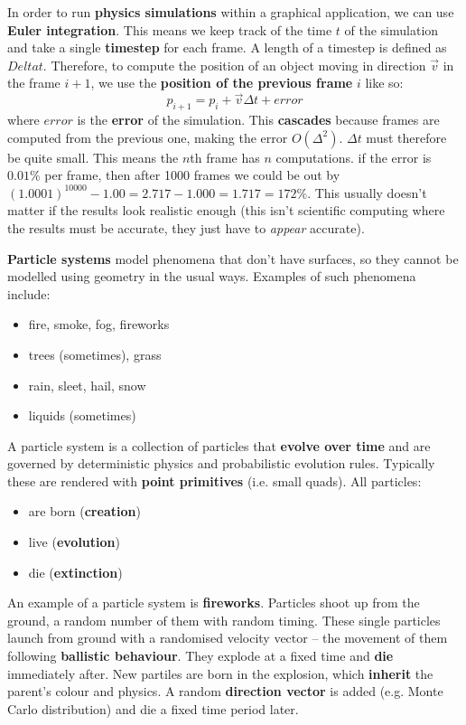 \documentclass{article}
\begin{document}
In order to run \textbf{physics simulations} within a graphical application, we can use \textbf{Euler integration}. This means we keep track of the time $t$ of the simulation and take a single \textbf{timestep}  for each frame. A length of a timestep is defined as $Delta t$.  Therefore, to compute the position of an object moving in direction $\vec{v}$ in the frame $i+1$, we use the \textbf{position of the previous frame} $i$ like so:
\begin{equation}
	p_{i+1} = p_i + \vec{v} \Delta t + error
	\label{eq:euler-integration}
\end{equation}
where $error$ is the \textbf{error} of the simulation. This \textbf{cascades} because frames are computed from the previous one, making the error $O(\Delta ^2)$. $\Delta t$ must therefore be quite small. This means the $n$th frame has $n$ computations. if the error is $0.01\%$ per frame, then after 1000 frames we could be out by $(1.0001)^{10000} - 1.00 = 2.717 - 1.000 = 1.717 = 172\%$. This usually doesn't matter if the results look realistic enough (this isn't scientific computing where the results must be accurate, they just have to \textit{appear} accurate).

\textbf{Particle systems} model phenomena that don't have surfaces, so they cannot be modelled using geometry in the usual ways. Examples of such phenomena include:
\begin{itemize}
	\item fire, smoke, fog, fireworks
	\item trees (sometimes), grass
	\item rain, sleet, hail, snow
	\item liquids (sometimes)
\end{itemize}

A particle system is a collection of particles that \textbf{evolve over time} and are governed by deterministic physics and probabilistic evolution rules. Typically these are rendered with \textbf{point primitives} (i.e. small quads). All particles:
\begin{itemize}
	\item are born (\textbf{creation})
	\item live (\textbf{evolution})
	\item die (\textbf{extinction})
\end{itemize}

An example of a particle system is \textbf{fireworks}. Particles shoot up from the ground, a random number of them with random timing. These single particles launch from ground with a randomised velocity vector -- the movement of them following \textbf{ballistic behaviour}. They explode at a fixed time and \textbf{die} immediately after. New partiles are born in the explosion, which \textbf{inherit} the parent's colour and physics. A random \textbf{direction vector} is added (e.g. Monte Carlo distribution) and die a fixed time period later.
\end{document}
